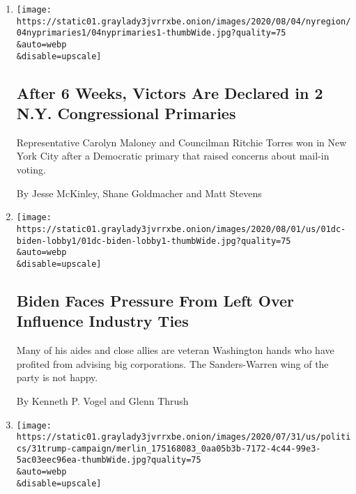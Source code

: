 \begin{enumerate}
\def\labelenumi{\arabic{enumi}.}
\item
  \href{/2020/08/04/nyregion/maloney-torres-ny-congressional-races.html}{}

  \texttt{[image: https://static01.graylady3jvrrxbe.onion/images/2020/08/04/nyregion/04nyprimaries1/04nyprimaries1-thumbWide.jpg?quality=75\\\&auto=webp\\\&disable=upscale]}

  \hypertarget{after-6-weeks-victors-are-declared-in-2-ny-congressional-primaries}{%
  \subsection{After 6 Weeks, Victors Are Declared in 2 N.Y.
  Congressional
  Primaries}\label{after-6-weeks-victors-are-declared-in-2-ny-congressional-primaries}}

  Representative Carolyn Maloney and Councilman Ritchie Torres won in
  New York City after a Democratic primary that raised concerns about
  mail-in voting.

  By Jesse McKinley, Shane Goldmacher and Matt Stevens
\item
  \href{/2020/08/01/us/politics/biden-lobbyist-ties.html}{}

  \texttt{[image: https://static01.graylady3jvrrxbe.onion/images/2020/08/01/us/01dc-biden-lobby1/01dc-biden-lobby1-thumbWide.jpg?quality=75\\\&auto=webp\\\&disable=upscale]}

  \hypertarget{biden-faces-pressure-from-left-over-influence-industry-ties}{%
  \subsection{Biden Faces Pressure From Left Over Influence Industry
  Ties}\label{biden-faces-pressure-from-left-over-influence-industry-ties}}

  Many of his aides and close allies are veteran Washington hands who
  have profited from advising big corporations. The Sanders-Warren wing
  of the party is not happy.

  By Kenneth P. Vogel and Glenn Thrush
\item
  \href{/2020/07/31/us/politics/trump-campaign-tv-advertising.html}{}

  \texttt{[image: https://static01.graylady3jvrrxbe.onion/images/2020/07/31/us/politics/31trump-campaign/merlin\_175168083\_0aa05b3b-7172-4c44-99e3-5ac03eec96ea-thumbWide.jpg?quality=75\\\&auto=webp\\\&disable=upscale]}


\end{enumerate}
